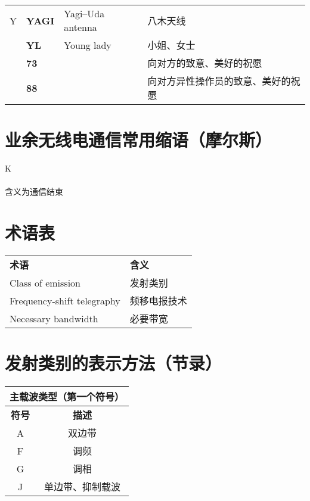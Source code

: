 \begin{longtable}[l]{llll}
  Y & \textbf{YAGI}                     & Yagi–Uda antenna                        & 八木天线                \\
    & \textbf{YL}                       & Young lady                              & 小姐、女士               \\
    & \textbf{73}                       &                                         & 向对方的致意、美好的祝愿        \\
    & \textbf{88}                       &                                         & 向对方异性操作员的致意、美好的祝愿   \\
\end{longtable}

\newpage

\section{业余无线电通信常用缩语（摩尔斯）}

\noindent K \\
 \\
含义为通信结束\\




\newpage

\section{术语表}

\begin{longtable}[l]{ll}
  \textbf{术语}                & \textbf{含义} \\
  Class of emission          & 发射类别        \\
  Frequency-shift telegraphy & 频移电报技术      \\
  Necessary bandwidth        & 必要带宽        \\
\end{longtable}

\newpage

\section{发射类别的表示方法（节录）}

\begin{tabular}{|c|c|}
  \hline
  \multicolumn{2}{|c|}{\textbf{主载波类型（第一个符号）}} \\
  \hline
  \textbf{符号} & \textbf{描述}                   \\
  \hline
  A           & 双边带                           \\
  \hline
  F           & 调频                            \\
  \hline
  G           & 调相                            \\
  \hline
  J           & 单边带、抑制载波                      \\
  \hline
\end{tabular}

